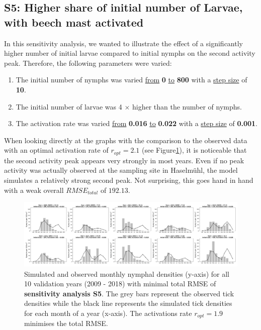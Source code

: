 \documentclass[a4paper, 11pt]{scrartcl}
\begin{document}
\subsection{S5: Higher share of initial number of Larvae, with beech mast activated}
In this sensitivity analysis, we wanted to illustrate the effect of a significantly higher number of initial larvae compared to initial nymphs on the second activity peak.
Therefore, the following parameters were varied:

\begin{enumerate}
\item The initial number of nymphs was varied \underline{from} \textbf{0} \underline{to} \textbf{800} with a \underline{step size} of \textbf{10}.
\item The initial number of larvae was 4 $\times$ higher than the number of nymphs.
\item The activation rate was varied \underline{from} \textbf{0.016} \underline{to} \textbf{0.022} with a \underline{step size} of \textbf{0.001}.
\end{enumerate}

When looking directly at the graphs with the comparison to the observed data with an optimal activation rate of $r_{opt}= 2.1$ (see Figure\ref{fig:1nymphs_4larvae}), it is
noticeable that the second activity peak appears very strongly in most years. Even if no peak activity was actually observed at the sampling site in Haselmühl, the model
simulates a relatively strong second peak. Not surprising, this goes hand in hand with a weak overall $RMSE_{total}$ of $192.13$.

\begin{figure}[h!]
\centering
\includegraphics[width=\linewidth]{figures/1nymphs_4larvae_with_beech}
\caption{Simulated and observed monthly nymphal densities (y-axis) for all 10 validation years (2009 - 2018) with minimal total RMSE of \textbf{sensitivity analysis S5}. The
grey bars represent the observed tick densities while the black line represents the simulated tick densities for each month of a year (x-axis). The activations rate $r_{opt}= 1.9$
minimises the total RMSE.}
\label{fig:1nymphs_4larvae}
\end{figure}
\end{document}
